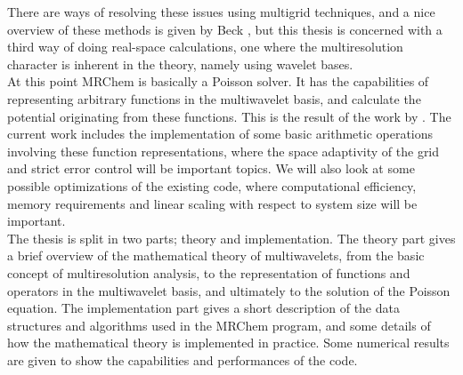 \noindent
There are ways of resolving these issues using multigrid techniques, and a nice
overview of these methods is given by Beck \cite{Beck}, but this thesis is 
concerned with a third way of doing real-space calculations, one where the
multiresolution character is inherent in the theory, namely using wavelet
bases.\\

\noindent
At this point MRChem is basically a Poisson solver. It has the capabilities of 
representing arbitrary functions in the multiwavelet basis, and calculate the 
potential originating from these functions. This is the result of the work by
\cite{Fossgaard}. The current work includes the
implementation of some basic arithmetic operations involving these function
representations, where the space adaptivity of the grid and strict error
control will be important topics. We will also look at some possible 
optimizations of the existing code, where computational efficiency, memory
requirements and linear scaling with respect to system size will be important.
\\

\noindent
The thesis is split in two parts; theory and implementation. The theory part
gives a brief overview of the mathematical theory of multiwavelets, from the
basic concept of multiresolution analysis, to the representation of functions 
and operators in the multiwavelet basis, and ultimately to the solution of the
Poisson equation. The implementation part gives a short description of the
data structures and algorithms used in the MRChem program, and some details of
how the mathematical theory is implemented in practice. Some numerical results
are given to show the capabilities and performances of the code.

\pagebreak
